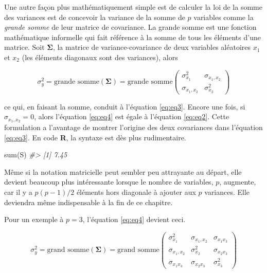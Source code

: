 \documentclass[
]{book}
\newenvironment{Shaded}{}{}
\newcommand{\CommentTok}[1]{\textit{#1}}
\newcommand{\FunctionTok}[1]{#1}
\newcommand{\NormalTok}[1]{#1}
\begin{document}
Une autre façon plus mathématiquement simple est de calculer la loi de la somme des variances est de concevoir la variance de la somme de \(p\) variables comme la \emph{grande somme} de leur matrice de covariance. La grande somme est une fonction mathématique informelle qui fait référence à la somme de tous les éléments d'une matrice. Soit \(\mathbf{\Sigma}\), la matrice de variance-covariance de deux variables aléatoires \(x_1\) et \(x_2\) (les éléments diagonaux sont des variances), alors

\begin{equation}
\sigma_y^2 = \text{grande somme}(\mathbf{\Sigma}) = \text{grande somme}\left(\begin{array}{cc}
\sigma_{x_1}^2 & \sigma_{x_1,x_2} \\
\sigma_{x_1,x_2} & \sigma_{x_2}^2
\end{array}\right)
\label{eq:eq4}
\end{equation}

ce qui, en faisant la somme, conduit à l'équation \eqref{eq:eq3}. Encore une fois, si \(\sigma_{x_1,x_2}=0\), alors l'équation \eqref{eq:eq4} est égale à l'équation \eqref{eq:eq2}. Cette formulation a l'avantage de montrer l'origine des deux covariances dans l'équation \eqref{eq:eq3}. En code \textbf{R}, la syntaxe est dès plus rudimentaire.

\begin{Shaded}
\begin{Highlighting}[]
\FunctionTok{sum}\NormalTok{(S)}
\CommentTok{\#\textgreater{} [1] 7.45}
\end{Highlighting}
\end{Shaded}

Même si la notation matricielle peut sembler peu attrayante au départ, elle devient beaucoup plus intéressante lorsque le nombre de variables, \(p\), augmente, car il y a \(p(p-1)/2\) éléments hors diagonale à ajouter aux \(p\) variances. Elle deviendra même indispensable à la fin de ce chapitre.

Pour un exemple à \(p=3\), l'équation \eqref{eq:eq4} devient ceci.

\begin{equation}
\sigma_y^2=\text{grand somme}(\mathbf{\Sigma})=\text{grand somme}
\left(\begin{array}{ccc}
\sigma_{x_1}^2&\sigma_{x_1,x_2}&\sigma_{x_1 x_3} \\
\sigma_{x_1,x_2}&\sigma_{x_2}^2&\sigma_{x_2 x_3}\\
\sigma_{x_1 x_3}&\sigma_{x_2 x_3}&\sigma_{x_3}^2
\end{array}
\right)
\label{eq:eq5}
\end{equation}
\end{document}
